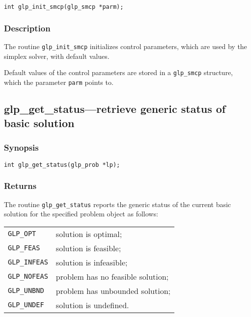 \begin{verbatim}
int glp_init_smcp(glp_smcp *parm);
\end{verbatim}

\subsubsection*{Description}

The routine \verb|glp_init_smcp| initializes control parameters, which
are used by the simplex solver, with default values.

Default values of the control parameters are stored in a \verb|glp_smcp|
structure, which the parameter \verb|parm| points to.


\newpage

\subsection{glp\_get\_status---retrieve generic status of basic
solution}

\subsubsection*{Synopsis}

\begin{verbatim}
int glp_get_status(glp_prob *lp);
\end{verbatim}

\subsubsection*{Returns}

The routine \verb|glp_get_status| reports the generic status of the
current basic solution for the specified problem object as follows:

\begin{tabular}{@{}ll}
\verb|GLP_OPT|    & solution is optimal; \\
\verb|GLP_FEAS|   & solution is feasible; \\
\verb|GLP_INFEAS| & solution is infeasible; \\
\verb|GLP_NOFEAS| & problem has no feasible solution; \\
\verb|GLP_UNBND|  & problem has unbounded solution; \\
\verb|GLP_UNDEF|  & solution is undefined. \\
\end{tabular}


